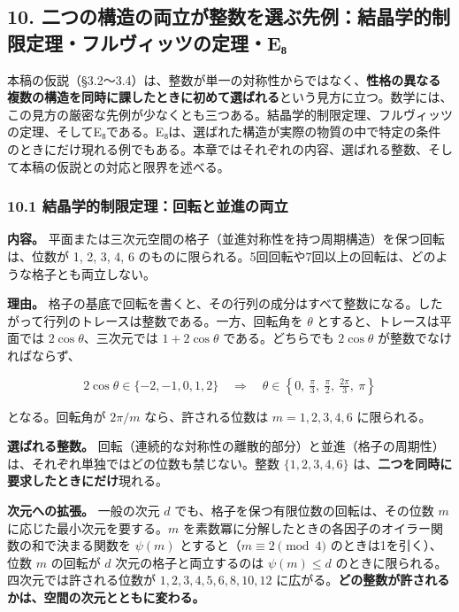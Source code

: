 \documentclass[
  a4paper,
]{ltjsarticle}
\begin{document}
\subsection{10.
二つの構造の両立が整数を選ぶ先例：結晶学的制限定理・フルヴィッツの定理・E₈}\label{ux4e8cux3064ux306eux69cbux9020ux306eux4e21ux7acbux304cux6574ux6570ux3092ux9078ux3076ux5148ux4f8bux7d50ux6676ux5b66ux7684ux5236ux9650ux5b9aux7406ux30d5ux30ebux30f4ux30a3ux30c3ux30c4ux306eux5b9aux7406eux2088}

本稿の仮説（§3.2〜3.4）は、整数が単一の対称性からではなく、\textbf{性格の異なる複数の構造を同時に課したときに初めて選ばれる}という見方に立つ。数学には、この見方の厳密な先例が少なくとも三つある。結晶学的制限定理、フルヴィッツの定理、そしてE₈である。E₈は、選ばれた構造が実際の物質の中で特定の条件のときにだけ現れる例でもある。本章ではそれぞれの内容、選ばれる整数、そして本稿の仮説との対応と限界を述べる。

\subsubsection{10.1
結晶学的制限定理：回転と並進の両立}\label{ux7d50ux6676ux5b66ux7684ux5236ux9650ux5b9aux7406ux56deux8ee2ux3068ux4e26ux9032ux306eux4e21ux7acb}

\textbf{内容。}
平面または三次元空間の格子（並進対称性を持つ周期構造）を保つ回転は、位数が
1, 2, 3, 4, 6
のものに限られる。5回回転や7回以上の回転は、どのような格子とも両立しない。

\textbf{理由。}
格子の基底で回転を書くと、その行列の成分はすべて整数になる。したがって行列のトレースは整数である。一方、回転角を
\(\theta\) とすると、トレースは平面では \(2\cos\theta\)、三次元では
\(1+2\cos\theta\) である。どちらでも \(2\cos\theta\)
が整数でなければならず、

\[
2\cos\theta\in\{-2,-1,0,1,2\}
\quad\Longrightarrow\quad
\theta\in\left\{0,\ \tfrac{\pi}{3},\ \tfrac{\pi}{2},\ \tfrac{2\pi}{3},\ \pi\right\}
\tag{13}
\]

となる。回転角が \(2\pi/m\) なら、許される位数は \(m=1,2,3,4,6\)
に限られる。

\textbf{選ばれる整数。}
回転（連続的な対称性の離散的部分）と並進（格子の周期性）は、それぞれ単独ではどの位数も禁じない。整数
\(\{1,2,3,4,6\}\) は、\textbf{二つを同時に要求したときにだけ}現れる。

\textbf{次元への拡張。} 一般の次元 \(d\)
でも、格子を保つ有限位数の回転は、その位数 \(m\)
に応じた最小次元を要する。\(m\)
を素数冪に分解したときの各因子のオイラー関数の和で決まる関数を
\(\psi(m)\) とすると（\(m\equiv2\pmod 4\) のときは1を引く）、位数 \(m\)
の回転が \(d\) 次元の格子と両立するのは \(\psi(m)\le d\)
のときに限られる。四次元では許される位数が \(1,2,3,4,5,6,8,10,12\)
に広がる。\textbf{どの整数が許されるかは、空間の次元とともに変わる。}
\end{document}
